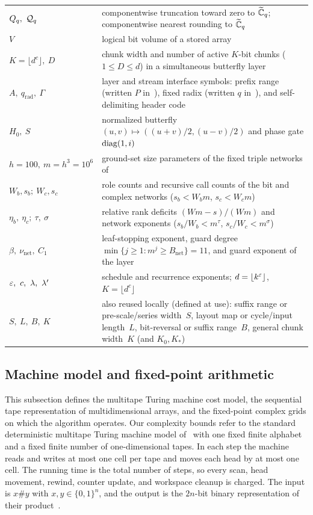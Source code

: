 \begin{table}[!t]
\begin{tabular}{@{}>{\raggedright}p{}>{\raggedright\arraybackslash}p{}@{}}
$Q_q,\ \Quant_q$ & componentwise truncation toward zero to $\widetilde{\mathbb{C}}_q$; componentwise nearest rounding to $\widetilde{\mathbb{C}}_q$\\
$V$ & logical bit volume of a stored array\\
$K=\lfloor d^c\rfloor,\ D$ & chunk width and number of active $K$-bit chunks ($1\le D\le d$) in a simultaneous butterfly layer\\
$A,\ q_{\mathrm{rad}},\ \Gamma$ & layer and stream interface symbols: prefix range (written $P$ in~\cite[Prop.~14]{OAI26}), fixed radix (written $q$ in~\cite{OAI26}), and self-delimiting header code~\cite[(1)]{OAI26}\\
$H_0,\ S$ & normalized butterfly $(u,v)\mapsto((u+v)/2,(u-v)/2)$ and phase gate $\operatorname{diag}(1,i)$\\
$h=100,\ m=h^3=10^6$ & ground-set size parameters of the fixed triple networks of~\cite{OAI26}\\
$W_b,s_b;\ W_c,s_c$ & role counts and recursive call counts of the bit and complex networks ($s_b<W_bm$, $s_c<W_cm$)\\
$\eta_b,\ \eta_c;\ \tau,\ \sigma$ & relative rank deficits $(Wm-s)/(Wm)$ and network exponents ($s_b/W_b<m^\tau$, $s_c/W_c<m^\sigma$)\\
$\beta,\ \nu_{\mathrm{net}},\ C_1$ & leaf-stopping exponent, guard degree $\min\{j\ge 1:m^j\ge B_{\mathrm{net}}\}=11$, and guard exponent of the layer\\
$\eps,\ c,\ \lambda,\ \lambda'$ & schedule and recurrence exponents; $d=\lfloor k^\varepsilon\rfloor$, $K=\lfloor d^c\rfloor$\\
$S,\ L,\ B,\ K$ & also reused locally (defined at use): suffix range or pre-scale/series width~$S$, layout map or cycle/input length~$L$, bit-reversal or suffix range~$B$, general chunk width~$K$ (and $K_0,K_*$)\\
\bottomrule
\end{tabular}
\end{table}

\subsection{Machine model and fixed-point arithmetic}\label{sec:prelim-model}\label{sec:prelim-grids}

This subsection defines the multitape Turing machine cost model, the sequential tape representation of multidimensional arrays, and the fixed-point complex grids on which the algorithm operates. Our complexity bounds refer to the standard deterministic multitape Turing machine model of~\cite{SS71,HvdH21,OAI26} with one fixed finite alphabet and a fixed finite number of one-dimensional tapes. In each step the machine reads and writes at most one cell per tape and moves each head by at most one cell. The running time is the total number of steps, so every scan, head movement, rewind, counter update, and workspace cleanup is charged. The input is $x\#y$ with $x,y\in\{0,1\}^n$, and the output is the $2n$-bit binary representation of their product~\cite[\S1]{OAI26}.

